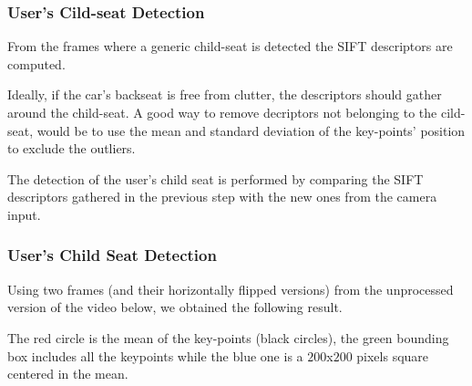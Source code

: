 \documentclass{beamer}
\begin{document}
	\begin{frame}
		\frametitle{User's Cild-seat Detection}

From the frames where a generic child-seat is detected the SIFT descriptors are computed. 

\bigskip
Ideally, if the car's backseat is free from clutter, the descriptors should gather around the child-seat. A good way to remove decriptors not belonging to the cild-seat, would be to use the mean and standard deviation of the key-points' position to exclude the outliers. 

\bigskip
The detection of the user's child seat is performed by comparing the SIFT descriptors gathered in the previous step with the new ones from the camera input.
		
	\end{frame}
	
	
	\begin{frame}
		\frametitle{User's Child Seat Detection}
		Using two frames (and their horizontally flipped versions) from the unprocessed version of the video below, we obtained the following result. 
			
		\bigskip
		\includemedia[
		width=\textwidth,
		addresource=videos/BB.mp4,
		transparent,
		activate=pagevisible,
		flashvars={
		source=videos/BB.mp4
		&autoplay=true
		&loop=false}
		]
		{\textcolor{white}{Video}}{VPlayer9.swf}
		
		\bigskip
		The red circle is the mean of the key-points (black circles), the green bounding box includes all the keypoints while the blue one is a $200$x$200$ pixels square centered in the mean. 
	\end{frame}
\end{document}
